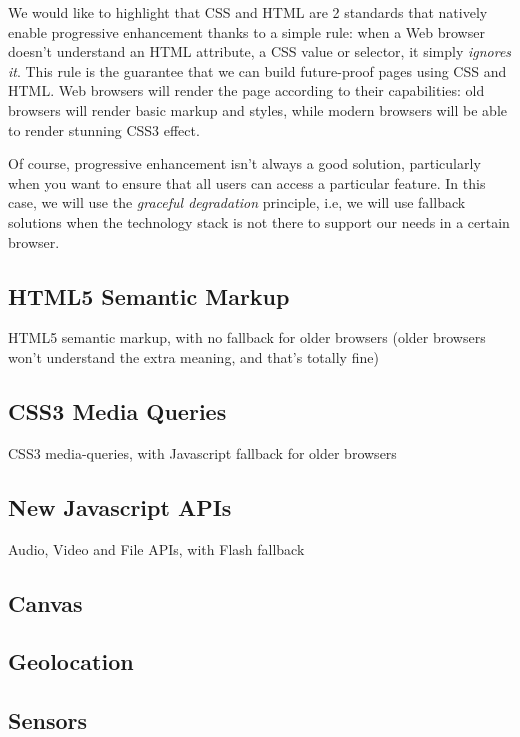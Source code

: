 \documentclass[runningheads,a4paper]{llncs} \usepackage[utf8]{inputenc}
\begin{document}
We would like to highlight that CSS and HTML are 2 standards that natively enable progressive enhancement thanks to a simple rule: when a Web browser doesn't understand an HTML attribute, a CSS value or selector, it simply \emph{ignores it}. This rule is the guarantee that we can build future-proof pages using CSS and HTML. Web browsers will render the page according to their capabilities: old browsers will render basic markup and styles, while modern browsers will be able to render stunning CSS3 effect.

Of course, progressive enhancement isn't always a good solution, particularly when you want to ensure that all users can access a particular feature. In this case, we will use the \emph{graceful degradation} principle, i.e, we will use fallback solutions when the technology stack is not there to support our needs in a certain browser. 

\subsection{HTML5 Semantic Markup} 

HTML5 semantic markup, with no fallback for older browsers (older browsers won't understand the extra meaning, and that's totally fine)

\subsection{CSS3 Media Queries} 

CSS3 media-queries, with Javascript fallback for older browsers

\subsection{New Javascript APIs}

 Audio, Video and File APIs, with Flash fallback

\subsection{Canvas}

\subsection{Geolocation}

\subsection{Sensors}
\end{document}
